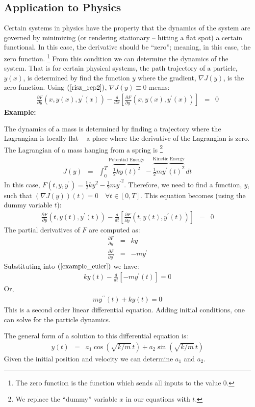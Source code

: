\documentclass{article}
\begin{document}
\subsection{Application to Physics}
Certain systems in physics have the property that the dynamics of the system are
governed by minimizing (or rendering stationary -- hitting a flat spot)
a certain functional. In this case,
the derivative should be ``zero''{}; meaning, in this case, the zero function.%
\footnote{The zero function is the function which sends all inputs to the value $0$.}
From this condition we can determine the dynamics of
the system. That is for certain physical systems, the path trajectory of a particle,
$y(x)$, is determined by find the function $y$ where the gradient,
$\nabla J(y)$, is the zero function. Using $(\ref{risz_rep2})$, $\nabla J(y) \equiv 0$
means:
\begin{eqnarray}
  \frac{\partial F}{\partial y}(x, y(x), y^\prime(x))
  - \frac{d}{dx} \left[ \frac{\partial F}{\partial y^\prime}(x, y(x), y^\prime(x))\right] & = & 0 \label{eulerlagrange}
\end{eqnarray}
{\bf Example:\/}

The dynamics of a mass is determined by finding a trajectory
where the Lagrangian is locally flat -- a place
where the derivative of the Lagrangian is zero.
The Lagrangian of a mass hanging from a spring is%
\footnote{We replace the ``dummy''{} variable $x$ in our equations with $t$.}
\begin{eqnarray}
  J(y) & = & \int_0^T \overbrace{\frac{1}{2}  k y(t)^2}^{\text{Potential Energy}}
                    - \overbrace{\frac{1}{2} m {y^\prime(t)}^2}^{\text{Kinetic Energy}} \, dt
\end{eqnarray}
In this case, $F(t, y, y^\prime) = \frac{1}{2} k y^2 - \frac{1}{2} m {y^\prime}^2$.
Therefore, we need to find a function, $y$, such that $(\nabla J(y))(t) = 0 \quad \forall t \in[0,T]$. This
equation becomes (using the dummy variable $t$):
\begin{eqnarray}
  \frac{\partial F}{\partial y}(t, y(t), y^\prime(t))
  - \frac{d}{dt} \left[ \frac{\partial F}{\partial y^\prime}(t, y(t), y^\prime(t))\right] & = & 0 \label{example_euler}
\end{eqnarray}
The partial derivatives of $F$ are computed as:
\begin{eqnarray}
  \frac{\partial F}{\partial y} & = & k y \\
  \frac{\partial F}{\partial y^\prime} & = & -my^\prime
\end{eqnarray}
Substituting into $(\ref{example_euler})$ we have:
\begin{eqnarray}
  k y(t) - \frac{d}{dt} \left[ - m y^\prime(t) \right] = 0
\end{eqnarray}
Or,
\begin{eqnarray}
  m y^{\prime\prime}(t) + k y(t) = 0
\end{eqnarray}
This is a second order linear differential equation. Adding initial conditions, one can
solve for the particle dynamics.

The general form of a solution to this differential equation is:
\begin{eqnarray}
  y(t) & = & a_1 \cos(\sqrt{k/m}\, t) + a_2 \sin(\sqrt{k/m}\, t)
\end{eqnarray}
Given the initial position and velocity we can determine $a_1$ and $a_2$.
\end{document}
